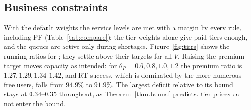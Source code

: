 \begin{table}[t]
\centering
\caption{Additional baselines, hotspot scenario: one elastic device declares video for its whole stay ($60$ devices on two traces; the first four rows are those of Table~\ref{tab:deviation} restricted to the same devices).}
\label{tab:baselines-synth-dev}

\end{table}

\begin{table}[t]
\centering
\caption{Additional baselines, trace-driven scenario, site PW0127, load $1$, truthful devices (mean over six traces $\pm$ half-width of the 95\% interval). The first four rows are repeated from Table~\ref{tab:real-compare}.}
\label{tab:baselines-real}
\resizebox{\linewidth}{!}{}
\end{table}

\begin{table}[t]
\centering
\caption{Additional baselines, trace-driven scenario, site PW0127, load $1$: one elastic device declares video for its whole stay ($120$ devices on six traces).}
\label{tab:baselines-real-dev}

\end{table}

\subsection{Business constraints}\label{sec:exp-tiers}

With the default weights the service levels are met with a margin by every rule, including \textsc{PF} (Table~\ref{tab:compare}): the tier weights alone give paid tiers enough, and the queues are active only during shortages.
Figure~\ref{fig:tiers} shows the running ratios for \repay{}; they settle above their targets for all $V$.
Raising the premium target moves capacity as intended: for $\theta_P=0.6,0.8,1.0,1.2$ the premium ratio is $1.27,1.29,1.34,1.42$, and RT success, which is dominated by the more numerous free users, falls from $94.9\%$ to $91.9\%$.
The largest deficit relative to its bound stays at $0.34$--$0.35$ throughout, as Theorem~\ref{thm:bound} predicts: tier prices do not enter the bound.


